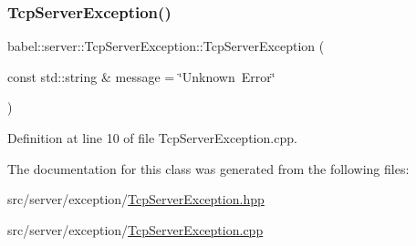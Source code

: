 \subsubsection{\texorpdfstring{Tcp\+Server\+Exception()}{TcpServerException()}}
{\footnotesize\ttfamily babel\+::server\+::\+Tcp\+Server\+Exception\+::\+Tcp\+Server\+Exception (\begin{DoxyParamCaption}\item[{const std\+::string \&}]{message = {\ttfamily \char`\"{}Unknown~Error\char`\"{}} }\end{DoxyParamCaption})\hspace{0.3cm}{\ttfamily [explicit]}}



Definition at line 10 of file Tcp\+Server\+Exception.\+cpp.



The documentation for this class was generated from the following files\+:\begin{DoxyCompactItemize}
\item 
src/server/exception/\mbox{\hyperlink{_tcp_server_exception_8hpp}{Tcp\+Server\+Exception.\+hpp}}\item 
src/server/exception/\mbox{\hyperlink{_tcp_server_exception_8cpp}{Tcp\+Server\+Exception.\+cpp}}\end{DoxyCompactItemize}
